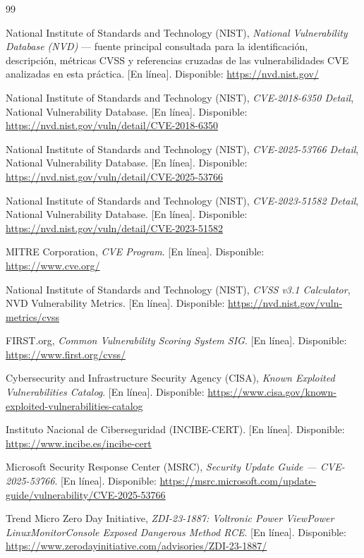 \begin{thebibliography}{99}

National Institute of Standards and Technology (NIST), \emph{National Vulnerability Database (NVD)} --- fuente principal consultada para la identificación, descripción, métricas CVSS y referencias cruzadas de las vulnerabilidades CVE analizadas en esta práctica. [En línea]. Disponible: \url{https://nvd.nist.gov/}

National Institute of Standards and Technology (NIST), \emph{CVE-2018-6350 Detail}, National Vulnerability Database. [En línea]. Disponible: \url{https://nvd.nist.gov/vuln/detail/CVE-2018-6350}

National Institute of Standards and Technology (NIST), \emph{CVE-2025-53766 Detail}, National Vulnerability Database. [En línea]. Disponible: \url{https://nvd.nist.gov/vuln/detail/CVE-2025-53766}

National Institute of Standards and Technology (NIST), \emph{CVE-2023-51582 Detail}, National Vulnerability Database. [En línea]. Disponible: \url{https://nvd.nist.gov/vuln/detail/CVE-2023-51582}

MITRE Corporation, \emph{CVE Program}. [En línea]. Disponible: \url{https://www.cve.org/}

National Institute of Standards and Technology (NIST), \emph{CVSS v3.1 Calculator}, NVD Vulnerability Metrics. [En línea]. Disponible: \url{https://nvd.nist.gov/vuln-metrics/cvss}

FIRST.org, \emph{Common Vulnerability Scoring System SIG}. [En línea]. Disponible: \url{https://www.first.org/cvss/}

Cybersecurity and Infrastructure Security Agency (CISA), \emph{Known Exploited Vulnerabilities Catalog}. [En línea]. Disponible: \url{https://www.cisa.gov/known-exploited-vulnerabilities-catalog}

Instituto Nacional de Ciberseguridad (INCIBE-CERT). [En línea]. Disponible: \url{https://www.incibe.es/incibe-cert}

Microsoft Security Response Center (MSRC), \emph{Security Update Guide --- CVE-2025-53766}. [En línea]. Disponible: \url{https://msrc.microsoft.com/update-guide/vulnerability/CVE-2025-53766}

Trend Micro Zero Day Initiative, \emph{ZDI-23-1887: Voltronic Power ViewPower LinuxMonitorConsole Exposed Dangerous Method RCE}. [En línea]. Disponible: \url{https://www.zerodayinitiative.com/advisories/ZDI-23-1887/}


\end{thebibliography}
